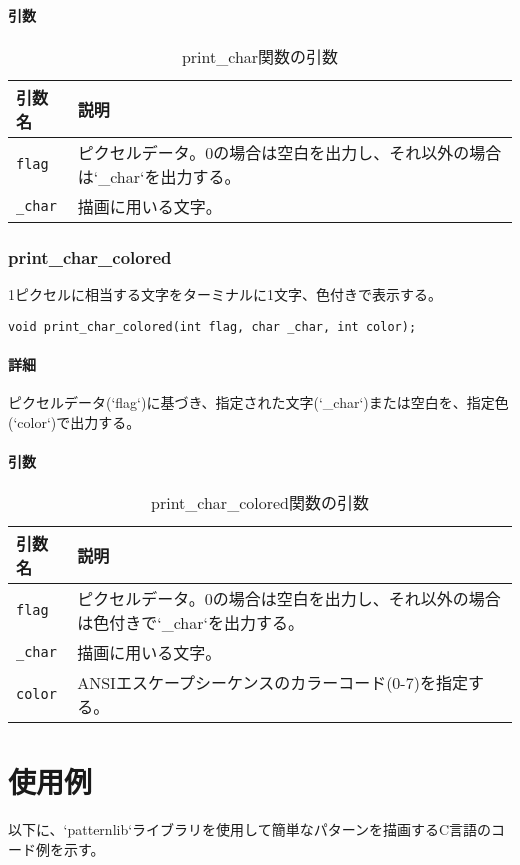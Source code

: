 \documentclass[uplatex]{jsarticle}
\begin{document}
\paragraph{引数}
\begin{table}[H]
    \centering
    \caption{print\_char関数の引数}
    \begin{tabular}{|l|p{9cm}|}
        \hline
        \textbf{引数名} & \textbf{説明} \\ \hline
        \texttt{flag} & ピクセルデータ。0の場合は空白を出力し、それ以外の場合は`\_char`を出力する。 \\ \hline
        \texttt{\_char} & 描画に用いる文字。 \\ \hline
    \end{tabular}
\end{table}

\subsubsection{print\_char\_colored}
1ピクセルに相当する文字をターミナルに1文字、色付きで表示する。
\begin{verbatim}
void print_char_colored(int flag, char _char, int color);
\end{verbatim}
\paragraph{詳細}
ピクセルデータ(`flag`)に基づき、指定された文字(`\_char`)または空白を、指定色(`color`)で出力する。
\paragraph{引数}
\begin{table}[H]
    \centering
    \caption{print\_char\_colored関数の引数}
    \begin{tabular}{|l|p{9cm}|}
        \hline
        \textbf{引数名} & \textbf{説明} \\ \hline
        \texttt{flag} & ピクセルデータ。0の場合は空白を出力し、それ以外の場合は色付きで`\_char`を出力する。 \\ \hline
        \texttt{\_char} & 描画に用いる文字。 \\ \hline
        \texttt{color} & ANSIエスケープシーケンスのカラーコード(0-7)を指定する。 \\ \hline
    \end{tabular}
\end{table}

\section{使用例}
以下に、`patternlib`ライブラリを使用して簡単なパターンを描画するC言語のコード例を示す。
\end{document}
